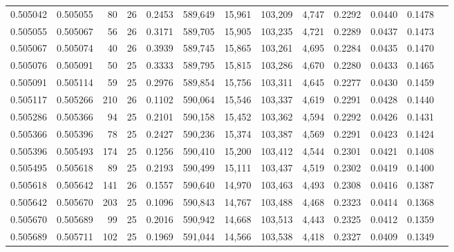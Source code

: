 \begin{tabular}{rrrrrrrrrrrrr}
0.505042 & 0.505055 &  80 &  26 &                                     0.2453 & 589,649 &  15,961 & 103,209 &   4,747 & 0.2292 & 0.0440 & 0.1478 \\
0.505055 & 0.505067 &  56 &  26 &                                     0.3171 & 589,705 &  15,905 & 103,235 &   4,721 & 0.2289 & 0.0437 & 0.1473 \\
0.505067 & 0.505074 &  40 &  26 &                                     0.3939 & 589,745 &  15,865 & 103,261 &   4,695 & 0.2284 & 0.0435 & 0.1470 \\
0.505076 & 0.505091 &  50 &  25 &                                     0.3333 & 589,795 &  15,815 & 103,286 &   4,670 & 0.2280 & 0.0433 & 0.1465 \\
0.505091 & 0.505114 &  59 &  25 &                                     0.2976 & 589,854 &  15,756 & 103,311 &   4,645 & 0.2277 & 0.0430 & 0.1459 \\
0.505117 & 0.505266 & 210 &  26 &                                     0.1102 & 590,064 &  15,546 & 103,337 &   4,619 & 0.2291 & 0.0428 & 0.1440 \\
0.505286 & 0.505366 &  94 &  25 &                                     0.2101 & 590,158 &  15,452 & 103,362 &   4,594 & 0.2292 & 0.0426 & 0.1431 \\
0.505366 & 0.505396 &  78 &  25 &                                     0.2427 & 590,236 &  15,374 & 103,387 &   4,569 & 0.2291 & 0.0423 & 0.1424 \\
0.505396 & 0.505493 & 174 &  25 &                                     0.1256 & 590,410 &  15,200 & 103,412 &   4,544 & 0.2301 & 0.0421 & 0.1408 \\
0.505495 & 0.505618 &  89 &  25 &                                     0.2193 & 590,499 &  15,111 & 103,437 &   4,519 & 0.2302 & 0.0419 & 0.1400 \\
0.505618 & 0.505642 & 141 &  26 &                                     0.1557 & 590,640 &  14,970 & 103,463 &   4,493 & 0.2308 & 0.0416 & 0.1387 \\
0.505642 & 0.505670 & 203 &  25 &                                     0.1096 & 590,843 &  14,767 & 103,488 &   4,468 & 0.2323 & 0.0414 & 0.1368 \\
0.505670 & 0.505689 &  99 &  25 &                                     0.2016 & 590,942 &  14,668 & 103,513 &   4,443 & 0.2325 & 0.0412 & 0.1359 \\
0.505689 & 0.505711 & 102 &  25 &                                     0.1969 & 591,044 &  14,566 & 103,538 &   4,418 & 0.2327 & 0.0409 & 0.1349 \\

\end{tabular}
